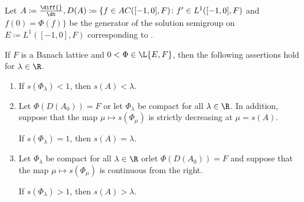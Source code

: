 \begin{theorem}\label{thm:c4-3.7}
Let $A \coloneqq \frac{\diff{}}{\dt}, D(A) \coloneqq \{f \in AC([-1,0],F) \colon f' \in L^{1}([-1,0],F)$ and $f(0) = \Phi(f)\}$ be the generator of the solution semigroup on $E \coloneqq L^{1}([-1,0],F)$ corresponding to . 

If\/ $F$ is a Banach lattice and $0 < \Phi \in \L{E,F}$, then the following assertions hold for $\lambda \in \R$.
\begin{enumerate}[\upshape (i)]
\item \label{thm:c4-3.7-1}
If\/ $s(\Phi_{\lambda}) < 1$, then $s(A) < \lambda$.
\item \label{thm:c4-3.7-2}
Let $\Phi(D(A_{0})) = F$ or let $\Phi_{\lambda}$ be compact for all $\lambda \in \R$. 
In addition, suppose that the map $\mu \mapsto s(\Phi_\mu)$ is strictly decreasing at $\mu = s(A)$. 

If\/ $s(\Phi_{\lambda}) = 1$, then $s(A) = \lambda$.
\item \label{thm:c4-3.7-3}
Let $\Phi_{\lambda}$ be compact for all $\lambda \in \R$ \quad or\quad let $\Phi(D(A_{0})) = F$ and suppose that the map $\mu \mapsto s(\Phi_\mu)$ is continuous from the right. 

If\/ $s(\Phi_{\lambda}) > 1$, then $s(A) > \lambda$.
\end{enumerate}
\end{theorem}

